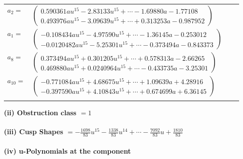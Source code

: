 \documentclass[1p]{elsarticle_modified}
\theoremstyle{definition}
\begin{document}
\begin{tabular}{m{7pt} m{180pt} m{7pt} m{180pt} }
\flushright $a_{2}=$&$\begin{pmatrix}0.590361 a u^{15}-2.83133 u^{15}+\cdots-1.69880 a-1.77108\\0.493976 a u^{15}-3.09639 u^{15}+\cdots+0.313253 a-0.987952\end{pmatrix}$ \\
\flushright $a_{1}=$&$\begin{pmatrix}-0.108434 a u^{15}-4.97590 u^{15}+\cdots-1.36145 a-0.253012\\-0.0120482 a u^{15}-5.25301 u^{15}+\cdots-0.373494 a-0.843373\end{pmatrix}$ \\
\flushright $a_{8}=$&$\begin{pmatrix}0.373494 a u^{15}+0.301205 u^{15}+\cdots+0.578313 a-2.66265\\0.469880 a u^{15}+0.0240964 u^{15}+\cdots-0.433735 a-3.25301\end{pmatrix}$ \\
\flushright $a_{10}=$&$\begin{pmatrix}-0.771084 a u^{15}+4.68675 u^{15}+\cdots+1.09639 a+4.28916\\-0.397590 a u^{15}+4.10843 u^{15}+\cdots+0.674699 a+6.36145\end{pmatrix}$\\&\end{tabular}
\flushleft \textbf{(ii) Obstruction class $= 1$}\\~\\
\flushleft \textbf{(iii) Cusp Shapes $= -\frac{1698}{83} u^{15}-\frac{1338}{83} u^{14}+\cdots-\frac{7092}{83} u+\frac{1810}{83}$}\\~\\
\newpage\renewcommand{\arraystretch}{1}
\flushleft \textbf{(iv) u-Polynomials at the component}\newline \\
\end{document}
